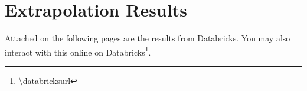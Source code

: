 \section{Extrapolation Results}
\label{app:results}

Attached on the following pages are the results from Databricks. You may also interact with this online on \href{\databricksurl}{Databricks}\footnote{\url{\databricksurl}}.


